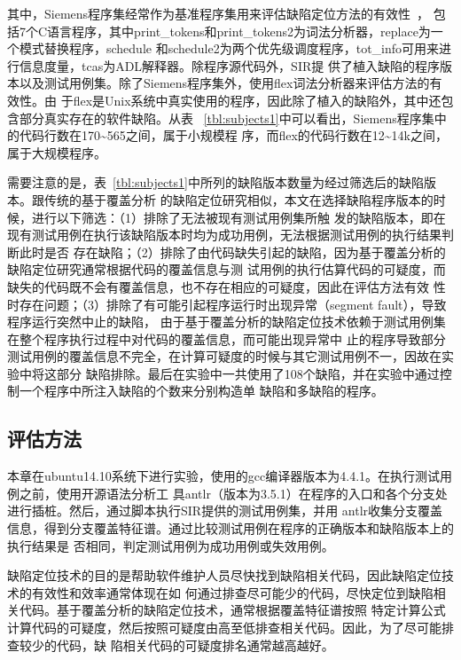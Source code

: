 其中，Siemens程序集经常作为基准程序集用来评估缺陷定位方法的有效性~\cite{guanlian2013,con-prob2018}，
包括7个C语言程序，其中print\_tokens和print\_tokens2为词法分析器，replace为一个模式替换程序，schedule
和schedule2为两个优先级调度程序，tot\_info可用来进行信息度量，tcas为ADL解释器。除程序源代码外，SIR提
供了植入缺陷的程序版本以及测试用例集。除了Siemens程序集外，使用flex词法分析器来评估方法的有效性。由
于flex是Unix系统中真实使用的程序，因此除了植入的缺陷外，其中还包含部分真实存在的软件缺陷。从表
~\ref{tbl:subjects1}中可以看出，Siemens程序集中的代码行数在170\textasciitilde565之间，属于小规模程
序，而flex的代码行数在12\textasciitilde14k之间，属于大规模程序。

需要注意的是，表~\ref{tbl:subjects1}中所列的缺陷版本数量为经过筛选后的缺陷版本。跟传统的基于覆盖分析
的缺陷定位研究相似，本文在选择缺陷程序版本的时候，进行以下筛选：（1）排除了无法被现有测试用例集所触
发的缺陷版本，即在现有测试用例在执行该缺陷版本时均为成功用例，无法根据测试用例的执行结果判断此时是否
存在缺陷；（2）排除了由代码缺失引起的缺陷，因为基于覆盖分析的缺陷定位研究通常根据代码的覆盖信息与测
试用例的执行估算代码的可疑度，而缺失的代码既不会有覆盖信息，也不存在相应的可疑度，因此在评估方法有效
性时存在问题；（3）排除了有可能引起程序运行时出现异常（segment fault），导致程序运行突然中止的缺陷，
由于基于覆盖分析的缺陷定位技术依赖于测试用例集在整个程序执行过程中对代码的覆盖信息，而可能出现异常中
止的程序导致部分测试用例的覆盖信息不完全，在计算可疑度的时候与其它测试用例不一，因故在实验中将这部分
缺陷排除。最后在实验中一共使用了108个缺陷，并在实验中通过控制一个程序中所注入缺陷的个数来分别构造单
缺陷和多缺陷的程序。

\subsection{评估方法}
本章在ubuntu14.10系统下进行实验，使用的gcc编译器版本为4.4.1。在执行测试用例之前，使用开源语法分析工
具antlr（版本为3.5.1）在程序的入口和各个分支处进行插桩。然后，通过脚本执行SIR提供的测试用例集，并用
antlr收集分支覆盖信息，得到分支覆盖特征谱。通过比较测试用例在程序的正确版本和缺陷版本上的执行结果是
否相同，判定测试用例为成功用例或失效用例。

缺陷定位技术的目的是帮助软件维护人员尽快找到缺陷相关代码，因此缺陷定位技术的有效性和效率通常体现在如
何通过排查尽可能少的代码，尽快定位到缺陷相关代码。基于覆盖分析的缺陷定位技术，通常根据覆盖特征谱按照
特定计算公式计算代码的可疑度，然后按照可疑度由高至低排查相关代码。因此，为了尽可能排查较少的代码，缺
陷相关代码的可疑度排名通常越高越好。

